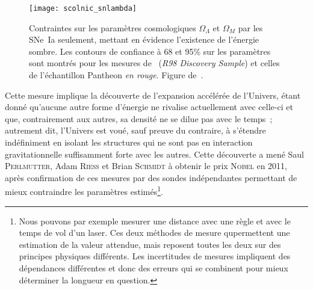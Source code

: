 \documentclass[../main/main.tex]{subfiles}
\begin{document}
\begin{SCfigure}[1][ht]
    \centering
    \texttt{[image: scolnic\_snlambda]}
    \caption[Contraintes sur les paramètres cosmologiques $\Omega_\Lambda$ et
    $\Omega_M$ par les SNe~Ia seulement]{Contraintes sur les paramètres
        cosmologiques $\Omega_\Lambda$ et $\Omega_M$ par les SNe~Ia seulement,
        mettant en évidence l'existence de l'énergie sombre. Les contours de
        confiance à 68 et 95\% sur les paramètres sont montrés pour les mesures
        de~\cite{riess1998} (\textit{R98 Discovery Sample}) et celles de
        l'échantillon Pantheon \textit{en rouge}. Figure
    de~\cite{scolnic2018}.}\label{fig:snlambda}
\end{SCfigure}


Cette mesure implique la découverte de l'expansion accélérée de l'Univers, étant
donné qu'aucune autre forme d'énergie ne rivalise actuellement avec celle-ci et
que, contrairement aux autres, sa densité ne se dilue pas avec le temps~;
autrement dit, l'Univers est voué, sauf preuve du contraire, à s'étendre
indéfiniment en isolant les structures qui ne sont pas en interaction
gravitationnelle suffisamment forte avec les autres. Cette découverte a mené
Saul \textsc{Perlmutter}, Adam \textsc{Riess} et Brian \textsc{Schmidt} à
obtenir le prix \textsc{Nobel} en 2011, après confirmation de ces mesures par
des sondes indépendantes permettant de mieux contraindre les paramètres
estimés\footnote{Nous pouvons par exemple mesurer une distance avec une règle et
    avec le temps de vol d'un laser. Ces deux méthodes de mesure qupermettent
    une estimation de la valeur attendue, mais reposent toutes les deux sur des
    principes physiques différents. Les incertitudes de mesures impliquent des
    dépendances différentes et donc des erreurs qui se combinent pour mieux
déterminer la longueur en question.}.
\end{document}

